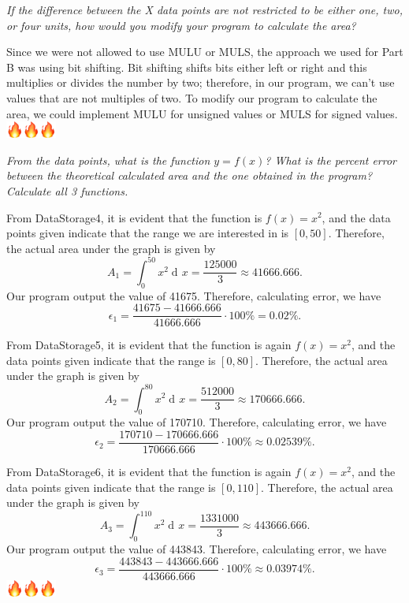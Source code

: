 \documentclass[10pt, letterpaper, titlepage]{article} %
\DeclareMathOperator{\di}{d\!} %
\newcommand*\fire{\includegraphics[height=1.5em,valign=B,raise=-0.2em]{Fire.png}}
\begin{document}
\begin{multicols*}{2}
\textit{If the difference between the X data points are not restricted to be either one, two, or four units, how would you modify your program to calculate the area?}

Since we were not allowed to use MULU or MULS, the approach we used for Part B was using bit shifting. Bit shifting shifts bits either left or right and this multiplies or divides the number by two; therefore, in our program, we can't use values that are not multiples of two. To modify our program to calculate the area, we could implement MULU for unsigned values or MULS for signed values. \fire \fire \fire

\textit{From the data points, what is the function $y = f(x)$? What is the percent error between the theoretical calculated area and the one obtained in the program? Calculate all 3 functions.}

From DataStorage4, it is evident that the function is $f(x) = x^2$, and the data points given indicate that the range we are interested in is $[0, 50]$. Therefore, the actual area under the graph is given by
\begin{equation}
	A_1 = \int_0^{50} x^2 \di x = \dfrac{125000}{3} \approx 41666.666.
\end{equation} 
Our program output the value of 41675. Therefore, calculating error, we have
\begin{equation}
	\epsilon_1 = \dfrac{41675 - 41666.666}{41666.666} \cdot 100\% = 0.02\%. 
\end{equation}

From DataStorage5, it is evident that the function is again $f(x) = x^2$, and the data points given indicate that the range is $[0, 80]$. Therefore, the actual area under the graph is given by
\begin{equation}
	A_2 = \int_0^{80} x^2 \di x = \dfrac{512000}{3} \approx 170666.666.
\end{equation} 
Our program output the value of 170710. Therefore, calculating error, we have
\begin{equation}
	\epsilon_2 = \dfrac{170710 - 170666.666}{170666.666} \cdot 100\% \approx 0.02539\%. 
\end{equation}

From DataStorage6, it is evident that the function is again $f(x) = x^2$, and the data points given indicate that the range is $[0, 110]$. Therefore, the actual area under the graph is given by
\begin{equation}
	A_3 = \int_0^{110} x^2 \di x = \dfrac{1331000}{3} \approx 443666.666.
\end{equation} 
Our program output the value of 443843. Therefore, calculating error, we have
\begin{equation}
	\epsilon_3 = \dfrac{443843 - 443666.666}{443666.666} \cdot 100\% \approx 0.03974\%. 
\end{equation}
\fire \fire \fire


\end{multicols*}
\end{document}
